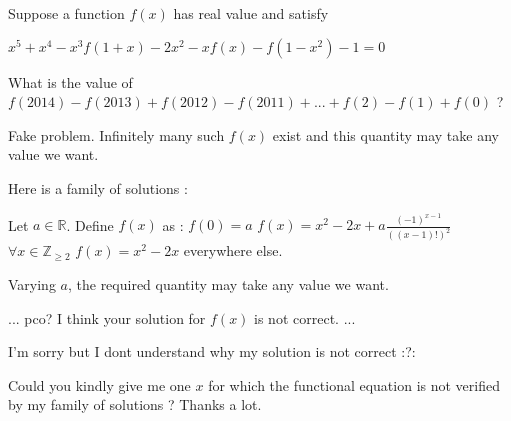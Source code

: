 \begin{solution}
	\begin{tcolorbox}Suppose a function $ f(x) $ has real value and satisfy

$ x^5+x^4-x^3f(1+x)-2x^2-xf(x)-f(1-x^2)-1=0 $

What is the value of $ f(2014) - f(2013)+f(2012)-f(2011)+...+f(2)-f(1)+f(0) $ ?\end{tcolorbox}
Fake problem. Infinitely many such $f(x)$ exist and this quantity may take any value we want.

Here is a family of solutions :

Let $a\in\mathbb R$. Define $f(x)$ as :
$f(0)=a$
$f(x)=x^2-2x+a\frac{(-1)^{x-1}}{((x-1)!)^2}$ $\forall x\in\mathbb Z_{\ge 2}$
$f(x)=x^2-2x$ everywhere else.

Varying $a$, the required quantity may take any value we want.
\end{solution}






\begin{solution}
	\begin{tcolorbox}...
pco? I think your solution for $f(x)$ is not correct.
...\end{tcolorbox}
I'm sorry but I dont understand why my solution is not correct :?:

Could you kindly give me one $x$ for which the functional equation is not verified by my family of solutions ?
Thanks a lot.
\end{solution}



